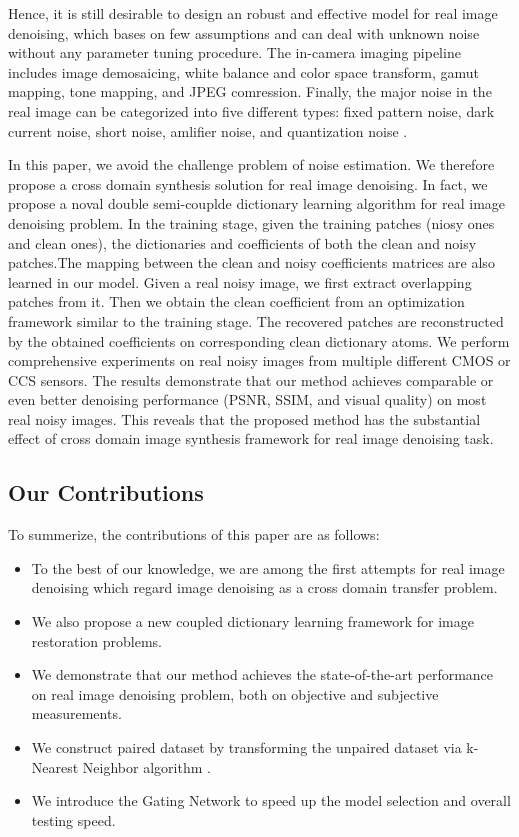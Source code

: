 \documentclass[10pt,twocolumn,letterpaper]{article}
\begin{document}
Hence, it is still desirable to design an robust and effective model for real image denoising, which bases on few assumptions and can deal with unknown noise without any parameter tuning procedure. The in-camera imaging pipeline includes image demosaicing, white balance and color space transform, gamut mapping, tone mapping, and JPEG comression. Finally, the major noise in the real image can be categorized into five different types: fixed pattern noise, dark current noise, short noise, amlifier noise, and quantization noise \cite{tsin2001statistical}.

In this paper, we avoid the challenge problem of noise estimation. We therefore propose a cross domain synthesis solution for real image denoising. In fact, we propose a noval double semi-couplde dictionary learning algorithm for real image denoising problem. In the training stage, given the training patches (niosy ones and clean ones), the dictionaries and coefficients of both the clean and noisy patches.The mapping between the clean and noisy coefficients matrices are also learned in our model. Given a real noisy image, we first extract overlapping patches from it. Then we obtain the clean coefficient from an optimization framework similar to the training stage. The recovered patches are reconstructed by the obtained coefficients on corresponding clean dictionary atoms. We perform comprehensive experiments on real noisy images from multiple different CMOS or CCS sensors. The results demonstrate that our method achieves comparable or even better denoising performance (PSNR, SSIM, and visual quality) on most real noisy images. This reveals that the proposed method has the substantial effect of cross domain image synthesis framework for real image denoising task.

\subsection{Our Contributions}
To summerize, the contributions of this paper are as follows:

\begin{itemize}
\item To the best of our knowledge, we are among the first attempts for real image denoising which regard image denoising as a cross domain transfer problem.
\item We also propose a new coupled dictionary learning framework for image restoration problems.
\item We demonstrate that our method achieves the state-of-the-art performance on real image denoising problem, both on objective and subjective measurements.
\item We construct paired dataset by transforming the unpaired dataset via k-Nearest Neighbor algorithm \cite{knn}.
\item We introduce the Gating Network to speed up the model selection and overall testing speed.
\end{itemize}
\end{document}

